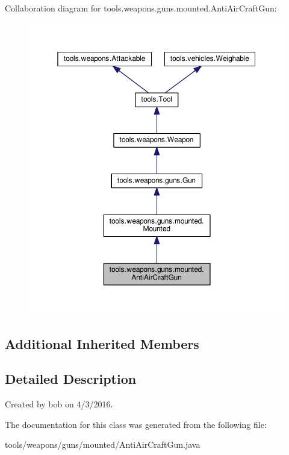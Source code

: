 Collaboration diagram for tools.\+weapons.\+guns.\+mounted.\+Anti\+Air\+Craft\+Gun\+:
\nopagebreak
\begin{figure}[H]
\begin{center}
\leavevmode
\includegraphics[width=350pt]{classtools_1_1weapons_1_1guns_1_1mounted_1_1_anti_air_craft_gun__coll__graph}
\end{center}
\end{figure}
\subsection*{Additional Inherited Members}


\subsection{Detailed Description}
Created by bob on 4/3/2016. 

The documentation for this class was generated from the following file\+:\begin{DoxyCompactItemize}
\item 
tools/weapons/guns/mounted/Anti\+Air\+Craft\+Gun.\+java\end{DoxyCompactItemize}
